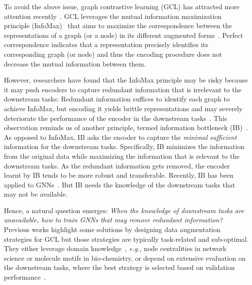 To avoid the above issue, graph contrastive learning (GCL) has attracted more attention recently~\cite{xie2021self,dgi,gmi, liu2021graph,sun2019infograph,hassani2020contrastive,zhang2020motif,thakoor2021bootstrapped,zhu2020graph,qiu2020gcc}. GCL leverages the mutual information maximization principle (InfoMax)~\cite{linsker1988self} that aims to maximize the correspondence between the representations of a graph (or a node) in its different augmented forms~\cite{sun2019infograph,hassani2020contrastive,you2020graph,zhang2020motif,thakoor2021bootstrapped,zhu2020graph,qiu2020gcc}. Perfect correspondence indicates that a representation precisely identifies its corresponding graph (or node) and thus the encoding procedure does not decrease the mutual information between them.
 
However, researchers have found that the InfoMax principle may be risky because it may push encoders to capture redundant information that is irrelevant to the downstream tasks: Redundant information suffices to identify each graph to achieve InfoMax, but encoding it yields brittle representations and may severely deteriorate the performance of the encoder in the downstream tasks~\cite{tschannen2019mutual}. This observation reminds us of another principle, termed information bottleneck (IB)~\cite{tishby2000information,tishby2015deep,goldfeld2020information,alemi2016deep,vdb,betavae}. As opposed to InfoMax, IB asks the encoder to capture the \emph{minimal sufficient} information for the downstream tasks. Specifically, IB minimizes the information from the original data while maximizing the information that is relevant to the downstream tasks. As the redundant information gets removed, the encoder learnt by IB tends to be more robust and transferable. Recently, IB has been applied to GNNs~\cite{wu2020graph,yu2021recognizing}. But IB needs the knowledge of the downstream tasks that may not be available. 
 
Hence, a natural question emerges: \emph{When the knowledge of downstream tasks are unavailable, how to train GNNs that may remove redundant information?} Previous works highlight some solutions by designing data augmentation strategies for GCL but those strategies are typically task-related and sub-optimal. They either leverage domain knowledge~\cite{hassani2020contrastive,zhang2020motif,zhu2020graph}, \textit{e.g.}, node centralities in network science or molecule motifs in bio-chemistry, or depend on extensive evaluation on the downstream tasks, where the best strategy is selected based on validation performance~\cite{you2020graph, zhu2020graph}. 

